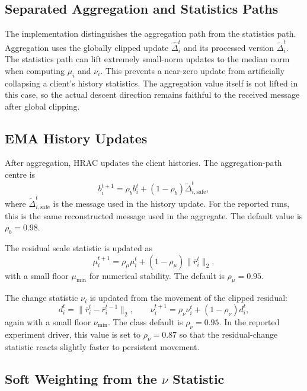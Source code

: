 \subsection{Separated Aggregation and Statistics Paths}

The implementation distinguishes the aggregation path from the statistics path.
Aggregation uses the globally clipped update $\hat{\Delta}_i^t$ and its
processed version $\tilde{\Delta}_i^t$. The statistics path can lift extremely
small-norm updates to the median norm when computing $\mu_i$ and $\nu_i$. This
prevents a near-zero update from artificially collapsing a client's history
statistics. The aggregation value itself is not lifted in this case, so the
actual descent direction remains faithful to the received message after global
clipping.

\subsection{EMA History Updates}

After aggregation, HRAC updates the client histories. The aggregation-path
centre is
\begin{equation}
    b_i^{t+1}
    =
    \rho_b b_i^t + (1-\rho_b)\tilde{\Delta}_{i,\mathrm{safe}}^t ,
\end{equation}
where $\tilde{\Delta}_{i,\mathrm{safe}}^t$ is the message used in the history
update.
For the reported runs, this is the same reconstructed message used in the
aggregate. The default value is $\rho_b=0.98$.

The residual scale statistic is updated as
\begin{equation}
    \mu_i^{t+1}
    =
    \rho_\mu \mu_i^t + (1-\rho_\mu)\|\bar r_i^t\|_2 ,
\end{equation}
with a small floor $\mu_{\min}$ for numerical stability. The default is
$\rho_\mu=0.95$.

The change statistic $\nu_i$ is updated from the movement of the clipped
residual:
\begin{equation}
    d_i^t = \|\bar r_i^t - \bar r_i^{t-1}\|_2 ,
    \qquad
    \nu_i^{t+1}
    =
    \rho_\nu \nu_i^t + (1-\rho_\nu)d_i^t ,
\end{equation}
again with a small floor $\nu_{\min}$. The class default is $\rho_\nu=0.95$.
In the reported experiment driver, this value is set to $\rho_\nu=0.87$ so that
the residual-change statistic reacts slightly faster to persistent movement.

\subsection{Soft Weighting from the \texorpdfstring{$\nu$}{nu} Statistic}

